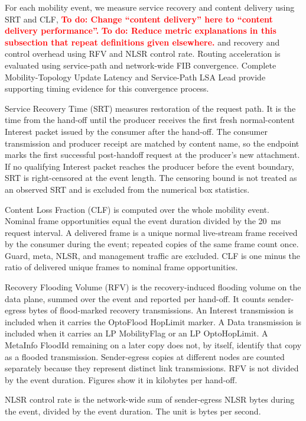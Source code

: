 \documentclass[10pt,conference]{IEEEtran}
\newcommand{\todo}[1]{\textbf{\textcolor{red}{To do: #1}}}
\begin{document}
For each mobility event, we measure service recovery and content delivery using SRT and CLF, \todo{Change ``content delivery'' here to ``content delivery performance''.} \todo{Reduce metric explanations in this subsection that repeat definitions given elsewhere.} and recovery and control overhead using RFV and NLSR control rate. Routing acceleration is evaluated using service-path and network-wide FIB convergence. Complete Mobility-Topology Update Latency and Service-Path LSA Lead provide supporting timing evidence for this convergence process.

Service Recovery Time (SRT) measures restoration of the request path. It is the time from the hand-off until the producer receives the first fresh normal-content Interest packet issued by the consumer after the hand-off. The consumer transmission and producer receipt are matched by content name, so the endpoint marks the first successful post-handoff request at the producer's new attachment. If no qualifying Interest packet reaches the producer before the event boundary, SRT is right-censored at the event length. The censoring bound is not treated as an observed SRT and is excluded from the numerical box statistics.

Content Loss Fraction (CLF) is computed over the whole mobility event. Nominal frame opportunities equal the event duration divided by the 20~ms request interval. A delivered frame is a unique normal live-stream frame received by the consumer during the event; repeated copies of the same frame count once. Guard, meta, NLSR, and management traffic are excluded. CLF is one minus the ratio of delivered unique frames to nominal frame opportunities.

Recovery Flooding Volume (RFV) is the recovery-induced flooding volume on the data plane, summed over the event and reported per hand-off. It counts sender-egress bytes of flood-marked recovery transmissions. An Interest transmission is included when it carries the OptoFlood HopLimit marker. A Data transmission is included when it carries an LP MobilityFlag or an LP OptoHopLimit. A MetaInfo FloodId remaining on a later copy does not, by itself, identify that copy as a flooded transmission. Sender-egress copies at different nodes are counted separately because they represent distinct link transmissions. RFV is not divided by the event duration. Figures show it in kilobytes per hand-off.

NLSR control rate is the network-wide sum of sender-egress NLSR bytes during the event, divided by the event duration. The unit is bytes per second.
\end{document}
